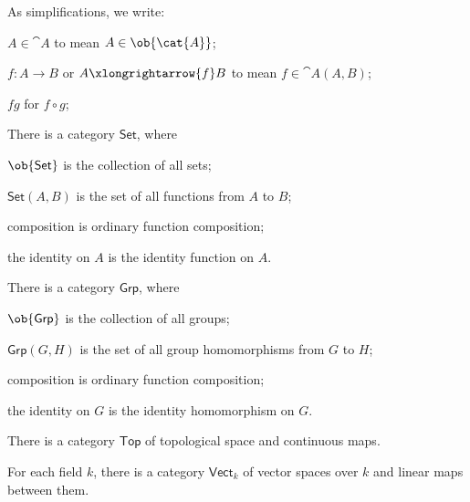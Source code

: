 \begin{remark}
  As simplifications, we write:
  \begin{enumalph}
    \item $A \in \cat{A}$ to mean $A \in \ob{\cat{A}}$;
    \item $f : A \to B$ or $A \xlongrightarrow{f} B$ to mean
      $f \in \cat{A}(A,B)$;
    \item $fg$ for $f \circ g$;
  \end{enumalph}
\end{remark}



\begin{examples}
  \begin{enumarabic}
    \item There is a category $\mathsf{Set}$, where
      \begin{enumalph}
        \item $\ob{\mathsf{Set}}$ is the collection of all sets;
        \item $\mathsf{Set}(A,B)$ is the set of all functions from $A$ to $B$;
        \item composition is ordinary function composition;
        \item the identity on $A$ is the identity function on $A$.
      \end{enumalph}
    \item There is a category $\mathsf{Grp}$, where
      \begin{enumalph}
        \item $\ob{\mathsf{Grp}}$ is the collection of all groups;
        \item $\mathsf{Grp}(G,H)$ is the set of all group homomorphisms from $G$ to $H$;
        \item composition is ordinary function composition;
        \item the identity on $G$ is the identity homomorphism on $G$.
      \end{enumalph}
    \item There is a category $\mathsf{Top}$ of topological space and continuous maps.
    \item For each field $k$, there is a category $\mathsf{Vect}_k$ of vector spaces over $k$
      and linear maps between them.
  \end{enumarabic}
\end{examples}

